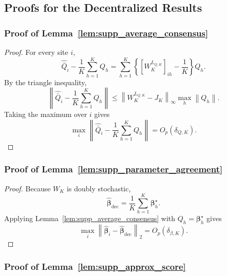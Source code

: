 \documentclass[12pt]{article}
\theoremstyle{remark}
\numberwithin{equation}{section}
\newcommand{\bbeta}{\boldsymbol{\beta}}
\newcommand{\norm}[1]{\left\lVert#1\right\rVert}
\begin{document}
\subsection{Proofs for the Decentralized Results}

\subsubsection{Proof of Lemma~\ref{lem:supp_average_consensus}}

\begin{proof}
For every site \(i\),
\[
\widehat{\bar Q}_i
-
\frac1K\sum_{h=1}^KQ_h
=
\sum_{h=1}^K
\left\{
[W_K^{L_{Q,K}}]_{ih}-\frac1K
\right\}Q_h.
\]
By the triangle inequality,
\[
\left\|
\widehat{\bar Q}_i
-
\frac1K\sum_{h=1}^KQ_h
\right\|
\le
\norm{W_K^{L_{Q,K}}-J_K}_{\infty}
\max_h\norm{Q_h}.
\]
Taking the maximum over \(i\) gives
\[
\max_i
\left\|
\widehat{\bar Q}_i
-
\frac1K\sum_{h=1}^KQ_h
\right\|
=
O_p(\delta_{Q,K}).
\]
\end{proof}

\subsubsection{Proof of Lemma~\ref{lem:supp_parameter_agreement}}

\begin{proof}
Because \(W_K\) is doubly stochastic,
\[
\widehat{\bbeta}_{\mathrm{dec}}
=
\frac1K\sum_{h=1}^K\bbeta_h^\star.
\]
Applying Lemma~\ref{lem:supp_average_consensus} with
\(Q_h=\bbeta_h^\star\) gives
\[
\max_i
\norm{\widehat{\bbeta}_i-\widehat{\bbeta}_{\mathrm{dec}}}_2
=
O_p(\delta_{\beta,K}).
\]
\end{proof}

\subsubsection{Proof of Lemma~\ref{lem:supp_approx_score}}
\end{document}

